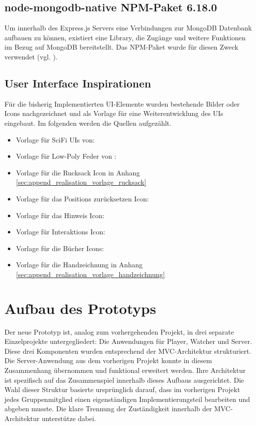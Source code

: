 \subsection{node-mongodb-native NPM-Paket 6.18.0}
Um innerhalb des Express.js Servers eine Verbindungen zur MongoDB Datenbank aufbauen zu können, existiert eine Library, die Zugänge und weitere Funktionen im Bezug auf MongoDB bereitstellt. Das \ac{NPM}-Paket  wurde für diesen Zweck verwendet (vgl. \citealp{mongodb_mongodbnode-mongodb-native_2025}).


\subsection{User Interface Inspirationen}\label{sec:user-interface-inspirations}
Für die bisherig Implementierten \ac{UI}-Elemente wurden bestehende Bilder oder Icons nachgezeichnet und als Vorlage für eine Weiterentwicklung des \ac{UI}s eingebaut. Im folgenden werden die Quellen aufgezählt.

\begin{itemize}
    \item Vorlage für SciFi \ac{UI}s von: \cite{pchvector_free_nodate}
    \item Vorlage für Low-Poly Feder von :\cite{masud_download_nodate}
    \item Vorlage für die Rucksack Icon in Anhang \ref{sec:append_realisation_vorlage_rucksack}
    \item Vorlage für das Positions zurücksetzen Icon: \cite{noauthor_chatgpt_2025}
    \item Vorlage für das Hinweis Icon: \cite{noauthor_chatgpt_2025-1}
    \item Vorlage für Interaktions Icon: \cite{noauthor_chatgpt_2024}
    \item Vorlage für die Bücher Icons: \cite{zhenstudio_book_2019}
    \item Vorlage für die Handzeichnung in Anhang \ref{sec:append_realisation_vorlage_handzeichnung}
\end{itemize}

\section{Aufbau des Prototyps}

Der neue Prototyp ist, analog zum vorhergehenden Projekt, in drei separate Einzelprojekte untergegliedert: Die Anwendungen für Player, Watcher und Server. Diese drei Komponenten wurden entsprechend der \ac{MVC}-Architektur strukturiert. Die Server-Anwendung aus dem vorherigen Projekt konnte in diesem Zusammenhang übernommen und funktional erweitert werden. Ihre Architektur ist spezifisch auf das Zusammenspiel innerhalb dieses Aufbaus ausgerichtet. Die Wahl dieser Struktur basierte ursprünglich darauf, dass im vorherigen Projekt jedes Gruppenmitglied einen eigenständigen Implementierungsteil bearbeiten und abgeben musste. Die klare Trennung der Zuständigkeit innerhalb der \ac{MVC}-Architektur unterstütze dabei.

